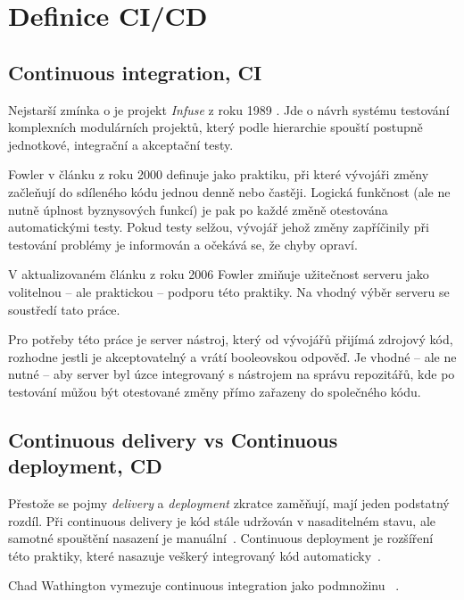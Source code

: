     \section{Definice CI/CD}
        \subsection{Continuous integration, CI}
            Nejstarší zmínka o \CI je projekt \textit{Infuse} z roku 1989 \cite{kaiser-infuse}. Jde o návrh systému testování komplexních modulárních projektů, který podle hierarchie spouští postupně jednotkové, integrační a akceptační testy.

            Fowler v článku z roku 2000 \cite{fowler-ci-original} definuje \CI jako praktiku, při které vývojáři změny začleňují do sdíleného kódu jednou denně nebo častěji. Logická funkčnost (ale ne nutně úplnost byznysových funkcí) je pak po každé změně otestována automatickými testy. Pokud testy selžou, vývojář jehož změny zapříčinily při testování problémy je informován a očekává se, že chyby opraví.

            V aktualizovaném článku z roku 2006 Fowler \cite{fowler-ci} zmiňuje užitečnost \CI serveru jako volitelnou -- ale praktickou -- podporu této praktiky. Na vhodný výběr \CI serveru se soustředí tato práce.

            Pro potřeby této práce je \CI server nástroj, který od vývojářů přijímá zdrojový kód, rozhodne jestli je akceptovatelný a vrátí booleovskou odpověď. Je vhodné -- ale ne nutné -- aby \CI server byl úzce integrovaný s nástrojem na správu repozitářů, kde po testování můžou být otestované změny přímo zařazeny do společného kódu.

        \subsection{Continuous delivery vs Continuous deployment, CD}
            Přestože se pojmy \textit{delivery} a \textit{deployment} zkratce \CD zaměňují, mají jeden podstatný rozdíl. Při continuous delivery je kód stále udržován v nasaditelném stavu, ale samotné spouštění nasazení je manuální~\cite{cd-delivery}. Continuous deployment je rozšíření této praktiky, které nasazuje veškerý integrovaný kód automaticky~\cite{cd-versus}.

            Chad Wathington vymezuje continuous integration jako podmnožinu \CD~\cite{fowler-go}.

